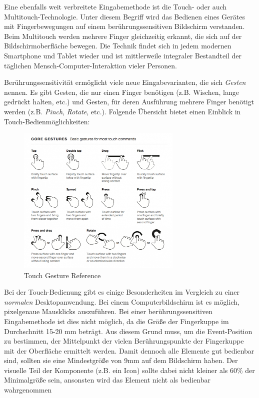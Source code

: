 Eine ebenfalls weit verbreitete Eingabemethode ist die Touch- oder auch Multitouch-Technologie. Unter diesem Begriff wird das Bedienen eines Gerätes mit Fingerbewegungen auf einem berührungssensitiven Bildschirm verstanden. Beim Multitouch werden mehrere Finger gleichzeitig erkannt, die sich auf der Bildschirmoberfläche bewegen. Die Technik findet sich in jedem modernen Smartphone und Tablet wieder und ist mittlerweile integraler Bestandteil der täglichen Mensch-Computer-Interaktion vieler Personen.\par
Berührungssensitivität ermöglicht viele neue Eingabevarianten, die sich \textit{Gesten} nennen. Es gibt Gesten, die nur einen Finger benötigen (z.B. Wischen, lange gedrückt halten, etc.) und Gesten, für deren Ausführung mehrere Finger benötigt werden (z.B. \textit{Pinch}, \textit{Rotate}, etc.). Folgende Übersicht bietet einen Einblick in Touch-Bedienmöglichkeiten:
\begin{figure}[H]
 \centering
 \includegraphics[width=0.7\textwidth]{grafiken/touchgestures.png}
 \caption{Touch Gesture Reference \cite{touchgestures2010}}
 \label{fig:touchGestures}
\end{figure}
Bei der Touch-Bedienung gibt es einige Besonderheiten im Vergleich zu einer \textit{normalen} Desktopanwendung. Bei einem Computerbildschirm ist es möglich, pixelgenaue Mausklicks auszuführen. Bei einer berührungssensitiven Eingabemethode ist dies nicht möglich, da die Größe der Fingerkuppe im Durchschnitt 15-20 mm beträgt. Aus diesem Grund muss, um die Event-Position zu bestimmen, der Mittelpunkt der vielen Berührungspunkte der Fingerkuppe mit der Oberfläche ermittelt werden. Damit dennoch alle Elemente gut bedienbar sind, sollten sie eine Mindestgröße von 9mm auf dem Bildschirm haben. Der visuelle Teil der Komponente (z.B. ein Icon) sollte dabei nicht kleiner als 60\% der Minimalgröße sein, ansonsten wird das Element nicht als bedienbar wahrgenommen \cite[S. 136]{Ullenboom2014}
